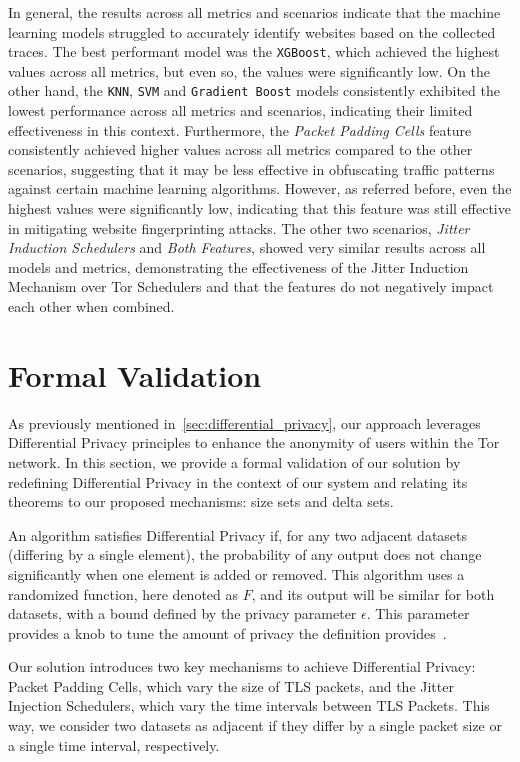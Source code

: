 In general, the results across all metrics and scenarios indicate that the machine learning models struggled to accurately identify websites based on the collected traces. The best performant model was the \texttt{XGBoost}, which achieved the highest values across all metrics, but even so, the values were significantly low. On the other hand, the \texttt{KNN}, \texttt{SVM} and \texttt{Gradient Boost} models consistently exhibited the lowest performance across all metrics and scenarios, indicating their limited effectiveness in this context. Furthermore, the \textit{Packet Padding Cells} feature consistently achieved higher values across all metrics compared to the other scenarios, suggesting that it may be less effective in obfuscating traffic patterns against certain machine learning algorithms. However, as referred before, even the highest values were significantly low, indicating that this feature was still effective in mitigating website fingerprinting attacks. The other two scenarios, \textit{Jitter Induction Schedulers} and \textit{Both Features}, showed very similar results across all models and metrics, demonstrating the effectiveness of the Jitter Induction Mechanism over Tor Schedulers and that the features do not negatively impact each other when combined.

\section{Formal Validation}\label{sec:formal_validation}

As previously mentioned in~\autoref{sec:differential_privacy}, our approach leverages Differential Privacy principles to enhance the anonymity of users within the Tor network. In this section, we provide a formal validation of our solution by redefining Differential Privacy in the context of our system and relating its theorems to our proposed mechanisms: size sets and delta sets.

An algorithm satisfies Differential Privacy if, for any two adjacent datasets (differing by a single element), the probability of any output does not change significantly when one element is added or removed. This algorithm uses a randomized function, here denoted as $F$, and its output will be similar for both datasets, with a bound defined by the privacy parameter $\epsilon$. This parameter provides a knob to tune the amount of privacy the definition provides~\cite*{DifPrivacy, DifPrivacyCalNoise, DP_Book, AlgFoundationsDP}.

Our solution introduces two key mechanisms to achieve Differential Privacy: Packet Padding Cells, which vary the size of TLS packets, and the Jitter Injection Schedulers, which vary the time intervals between TLS Packets. This way, we consider two datasets as adjacent if they differ by a single packet size or a single time interval, respectively.


